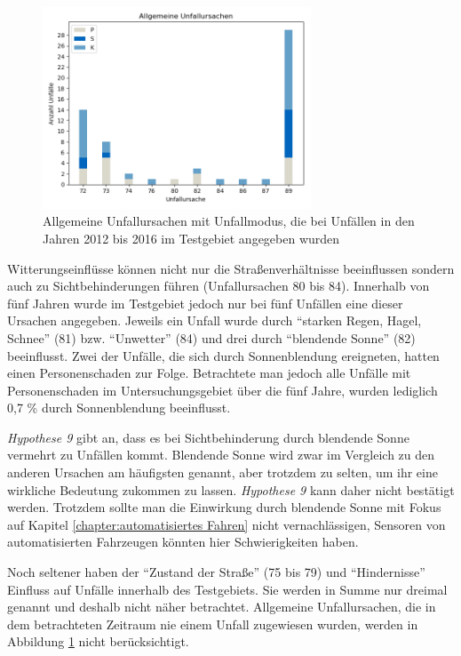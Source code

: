 \begin{savenotes}
	\begin{figure}[H]
		\centering
		\includegraphics[width=8cm,height=6cm]{figures/allg_Ursachen}
		\caption[Allgemeine Unfallursachen mit Unfallmodus, die bei Unfällen in den Jahren 2012 bis 2016 im Testgebiet angegeben wurden]{Allgemeine Unfallursachen mit Unfallmodus, die bei Unfällen in den Jahren 2012 bis 2016 im Testgebiet angegeben wurden}\label{fig:allg_Ursachen}
	\end{figure}
\end{savenotes}

Witterungseinflüsse können nicht nur die Straßenverhältnisse beeinflussen sondern auch zu Sichtbehinderungen führen (Unfallursachen 80 bis 84). Innerhalb von fünf Jahren wurde im Testgebiet jedoch nur bei fünf Unfällen eine dieser Ursachen angegeben. Jeweils ein Unfall wurde durch \enquote{starken Regen, Hagel, Schnee} (81) bzw. \enquote{Unwetter} (84) und drei durch \enquote{blendende Sonne} (82) beeinflusst. Zwei der Unfälle, die sich durch Sonnenblendung ereigneten, hatten einen Personenschaden zur Folge. Betrachtete man jedoch alle Unfälle mit Personenschaden im Untersuchungsgebiet über die fünf Jahre, wurden lediglich 0,7 \% durch Sonnenblendung beeinflusst.

\textit{Hypothese 9} gibt an, dass es bei Sichtbehinderung durch blendende Sonne vermehrt zu Unfällen kommt. Blendende Sonne wird zwar im Vergleich zu den anderen Ursachen am häufigsten genannt, aber trotzdem zu selten, um ihr eine wirkliche Bedeutung zukommen zu lassen. \textit{Hypothese 9} kann daher nicht bestätigt werden. Trotzdem sollte man die Einwirkung durch blendende Sonne mit Fokus auf Kapitel \ref{chapter:automatisiertes Fahren} nicht vernachlässigen, Sensoren von automatisierten Fahrzeugen könnten hier Schwierigkeiten haben.
 
Noch seltener haben der \enquote{Zustand der Straße} (75 bis 79) und \enquote{Hindernisse} Einfluss auf Unfälle innerhalb des Testgebiets. Sie werden in Summe nur dreimal genannt und deshalb nicht näher betrachtet. Allgemeine Unfallursachen, die in dem betrachteten Zeitraum nie einem Unfall zugewiesen wurden, werden in Abbildung \ref{fig:allg_Ursachen} nicht berücksichtigt.


